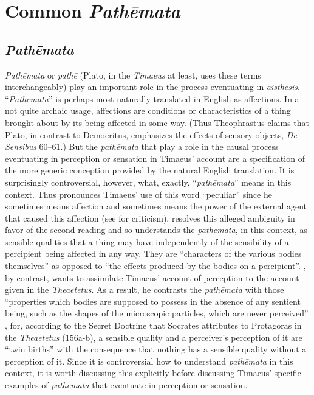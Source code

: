 
\chapter{Common \emph{Pathēmata}} %
\label{cha:common_pathemata}

\section{\emph{Pathēmata}} %
\label{sec:pathemata}

\emph{Pathēmata} or \emph{pathē} (Plato, in the \emph{Timaeus} at least, uses these terms interchangeably) play an important role in the process eventuating in \emph{aisthēsis}. ``\emph{Pathēmata}'' is perhaps most naturally translated in English as affections. In a not quite archaic usage, affections are conditions or characteristics of a thing brought about by its being affected in some way. (Thus Theophrastus claims that Plato, in contrast to Democritus, emphasizes the effects of sensory objects, \emph{De Sensibus} 60--61.) But the \emph{pathēmata} that play a role in the causal process eventuating in perception or sensation in Timaeus' account are a specification of the more generic conception provided by the natural English translation. It is surprisingly controversial, however, what, exactly, ``\emph{pathēmata}'' means in this context. Thus \citet[225 n8]{Archer-Hind:1888qd} pronounces Timaeus' use of this word ``peculiar'' since he sometimes means affection and sometimes means the power of the external agent that caused this affection (see \citealt[113--5]{Cook-Wilson:1889cs} for criticism). \citet[429-31]{Taylor:1928qb} resolves this alleged ambiguity in favor of the second reading and so understands the \emph{pathēmata}, in this context, as sensible qualities that a thing may have independently of the sensibility of a percipient being affected in any way. They are ``characters of the various bodies themselves'' as opposed to ``the effects produced by the bodies on a percipient''. \citet[258-9]{Cornford:1935fk}, by contrast, wants to assimilate Timaeus' account of perception to the account given in the \emph{Theaetetus}. As a result, he contrasts the \emph{pathēmata} with those ``properties which bodies are supposed to possess in the absence of any sentient being, such as the shapes of the microscopic particles, which are never perceived'' \citep[259]{Cornford:1935fk}, for, according to the Secret Doctrine that Socrates attributes to Protagoras in the \emph{Theaetetus} (156a-b), a sensible quality and a perceiver's perception of it are ``twin births'' with the consequence that nothing has a sensible quality without a perception of it. Since it is controversial how to understand \emph{pathēmata} in this context, it is worth discussing this explicitly before discussing Timaeus' specific examples of \emph{pathēmata} that eventuate in perception or sensation.

